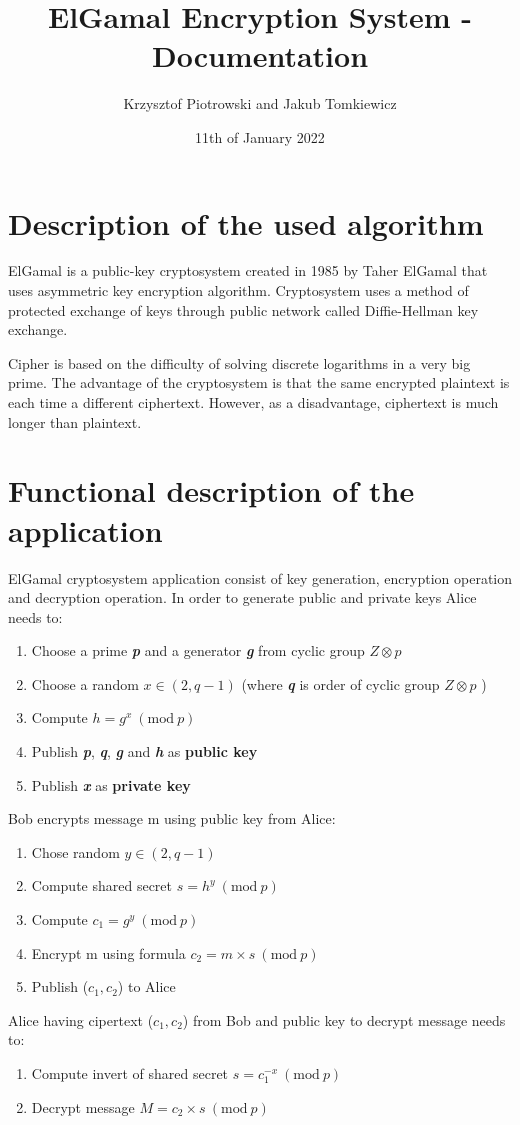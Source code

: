 \documentclass[a4paper,12pt]{article}
\newcommand{\Mod}[1]{\ (\mathrm{mod}\ #1)}
\begin{document}
\title{ElGamal Encryption System - Documentation }
\author{Krzysztof Piotrowski and Jakub Tomkiewicz}
\date{11th of January 2022}
\maketitle

\section{Description of the used algorithm}

ElGamal is a public-key cryptosystem created in 1985 by Taher ElGamal that uses asymmetric key encryption algorithm. 
Cryptosystem uses a method of protected exchange of keys through public network called Diffie-Hellman key exchange.

Cipher is based on the difficulty of solving discrete logarithms in a very big prime. 
The advantage of the cryptosystem is that the same encrypted plaintext is each time a different ciphertext.
However, as a disadvantage, ciphertext is much longer than plaintext.

\section{Functional description of the application}

ElGamal cryptosystem application consist of key generation, encryption operation and decryption operation.
In order to generate public and private keys Alice needs to:
\begin{enumerate}
\item   Choose a prime \textbf{\textit{p}} and a generator \textbf{\textit{g}} from cyclic group \textbf{\textit{$ Z\otimes p $}}
\item   Choose a random $x \in (2,q-1)$ (where \textbf{\textit{q}} is order of cyclic group \textbf{\textit{$ Z\otimes p $}} )
\item	Compute $ h = g^x \Mod p $
\item	Publish \textbf{\textit{p}}, \textbf{\textit{q}}, \textbf{\textit{g}} and \textbf{\textit{h}} as \textbf{public key}
\item   Publish \textbf{\textit{x}} as \textbf{private key}
\end{enumerate}
Bob encrypts message m using public key from Alice:
\begin{enumerate}
\item	Chose random $ y \in (2,q-1) $
\item	Compute shared secret $ s = h^y \Mod p$
\item	Compute $ c_1 = g^y \Mod p $
\item	Encrypt m using formula $ c_2 = m \times s \Mod p $
\item	Publish ($c_1, c_2$) to Alice
\end{enumerate}
Alice having cipertext ($c_1, c_2$) from Bob and public key to decrypt message needs to:
\begin{enumerate}
\item	Compute invert of shared secret $ s = c_1^{-x} \Mod p $
\item	Decrypt message  $ M = c_2 \times s \Mod p $
\end{enumerate}
\end{document}
